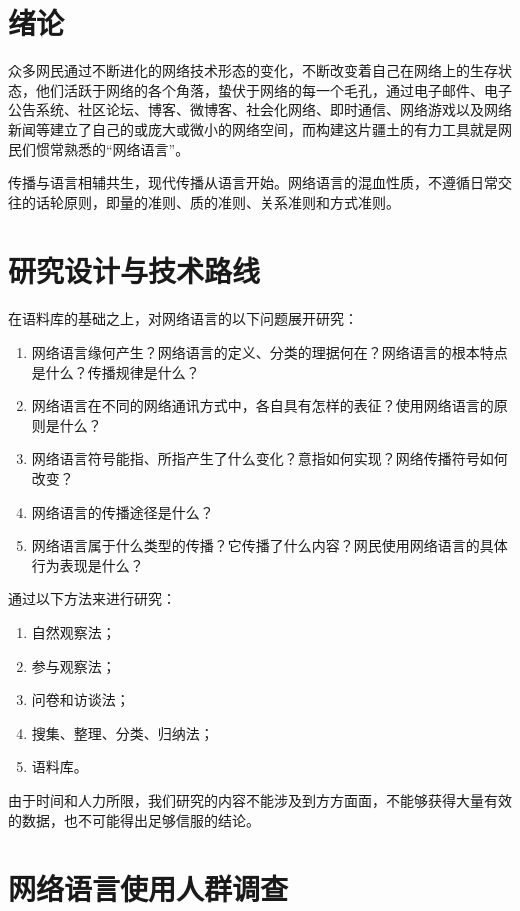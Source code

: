 \section{绪论}

众多网民通过不断进化的网络技术形态的变化，不断改变着自己在网络上的生存状态，他们活跃于网络的各个角落，蛰伏于网络的每一个毛孔，通过电子邮件、电子公告系统、社区论坛、博客、微博客、社会化网络、即时通信、网络游戏以及网络新闻等建立了自己的或庞大或微小的网络空间，而构建这片疆土的有力工具就是网民们惯常熟悉的“网络语言”。

传播与语言相辅共生，现代传播从语言开始。网络语言的混血性质，不遵循日常交往的话轮原则，即量的准则、质的准则、关系准则和方式准则。

\section{研究设计与技术路线}

在语料库的基础之上，对网络语言的以下问题展开研究：
\begin{enumerate}
\item 网络语言缘何产生？网络语言的定义、分类的理据何在？网络语言的根本特点是什么？传播规律是什么？
\item 网络语言在不同的网络通讯方式中，各自具有怎样的表征？使用网络语言的原则是什么？
\item 网络语言符号能指、所指产生了什么变化？意指如何实现？网络传播符号如何改变？
\item 网络语言的传播途径是什么？
\item 网络语言属于什么类型的传播？它传播了什么内容？网民使用网络语言的具体行为表现是什么？
\end{enumerate}

通过以下方法来进行研究：
\begin{enumerate}
\item 自然观察法；
\item 参与观察法；
\item 问卷和访谈法；
\item 搜集、整理、分类、归纳法；
\item 语料库。
\end{enumerate}

由于时间和人力所限，我们研究的内容不能涉及到方方面面，不能够获得大量有效的数据，也不可能得出足够信服的结论。

\section{网络语言使用人群调查}

